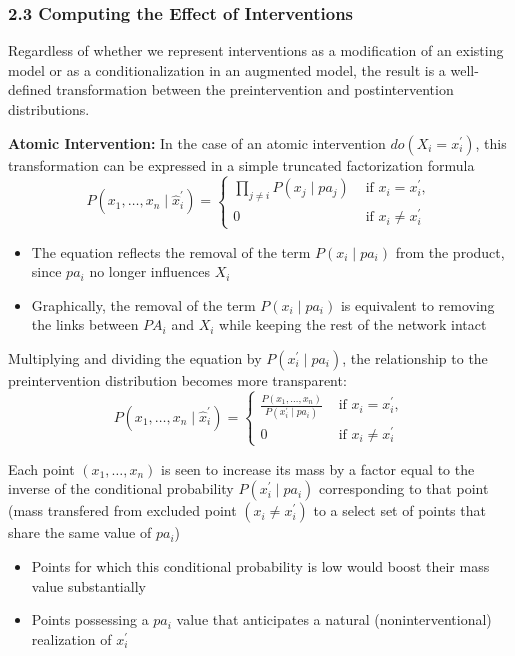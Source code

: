 \documentclass{beamer}
\begin{document}
\begin{frame}
\frametitle{2.3 Computing the Effect of Interventions}
Regardless of whether we represent interventions as a modification of an existing model or as a conditionalization in an augmented model, the result is a well-defined transformation between the preintervention and postintervention distributions.

\vspace{0.3cm}
\textbf{Atomic Intervention:} In the case of an atomic intervention $do\left(X_i=x_i^{\prime}\right)$, this transformation can be expressed in a simple truncated factorization formula
$$
P\left(x_1, \ldots, x_n \mid \hat{x}_i^{\prime}\right)= \begin{cases}\prod_{j \neq i} P\left(x_j \mid p a_j\right) & \text { if } x_i=x_i^{\prime}, \\ 0 & \text { if } x_i \neq x_i^{\prime}\end{cases}
$$

\begin{itemize}
\item The equation reflects the removal of the term $P\left(x_i \mid p a_i\right)$ from the product, since $p a_i$ no longer influences $X_i$
\item Graphically, the removal of the term $P\left(x_i \mid p a_i\right)$ is equivalent to removing the links between $P A_i$ and $X_i$ while keeping the rest of the network intact
\end{itemize}
\end{frame}

\begin{frame}
Multiplying and dividing the equation by $P\left(x_i^{\prime} \mid p a_i\right)$, the relationship to the preintervention distribution becomes more transparent:
$$
P\left(x_1, \ldots, x_n \mid \hat{x}_i^{\prime}\right)= \begin{cases}\frac{P\left(x_1, \ldots, x_n\right)}{P\left(x_i^{\prime} \mid p a_i\right)} & \text { if } x_i=x_i^{\prime}, \\ 0 & \text { if } x_i \neq x_i^{\prime}\end{cases}
$$

Each point $\left(x_1, \ldots, x_n\right)$ is seen to increase its mass by a factor equal to the inverse of the conditional probability $P\left(x_i^{\prime} \mid p a_i\right)$ corresponding to that point (mass transfered from excluded point $\left(x_i \neq x_i^{\prime} \right)$ to a select set of points that share the same value of $p a_i$)

\begin{itemize}
\item Points for which this conditional probability is low would boost their mass value substantially
\item Points possessing a $p a_i$ value that anticipates a natural (noninterventional) realization of $x_i^{\prime}$
\end{itemize}
\end{frame}
\end{document}
